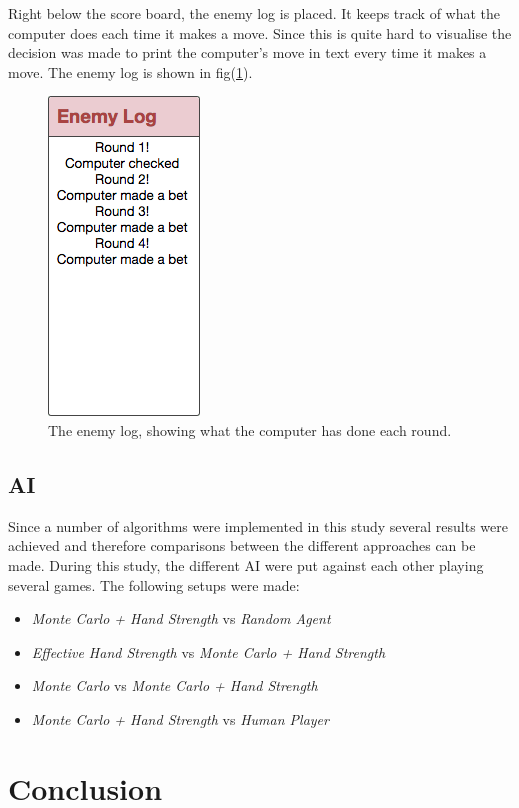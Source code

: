 \documentclass[journal]{vgtc}                %
\begin{document}
Right below the score board, the enemy log is placed. It keeps track of what the computer does each time it makes a move. Since this is quite hard to visualise the decision was made to print the computer's move in text every time it makes a move. The enemy log is shown in fig(\ref{fig:ui3}).
\begin{figure}[here]
  \begin{center}
    \includegraphics[scale=0.50]{img/ui4.png}
    \caption{\label{fig:ui3} The enemy log, showing what the computer has done each round.}
  \end{center}
\end{figure}

\subsection{AI}
Since a number of algorithms were implemented in this study several results were achieved and therefore comparisons between the different approaches can be made. During this study, the different AI were put against each other playing several games. The following setups were made: 
\begin{itemize}
\item \textit{Monte Carlo + Hand Strength} vs \textit{Random Agent}
\item \textit{Effective Hand Strength} vs \textit{Monte Carlo + Hand Strength}
\item \textit{Monte Carlo} vs \textit{Monte Carlo + Hand Strength}
\item \textit{Monte Carlo + Hand Strength} vs \textit{Human Player}
\end{itemize}

\section{Conclusion}
\end{document}
